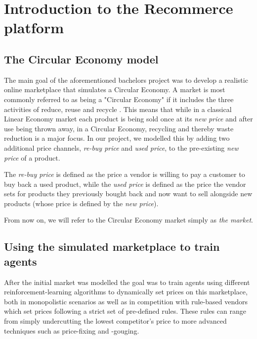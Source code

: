 \section{Introduction to the Recommerce platform}

\subsection{The Circular Economy model}\label{subsection:CircularEconomy}
The main goal of the aforementioned bachelors project was to develop a realistic online marketplace that simulates a Circular Economy. A market is most commonly referred to as being a "Circular Economy" if it includes the three activities of reduce, reuse and recycle \cite{circularEconomyDefinition}. This means that while in a classical Linear Economy market each product is being sold once at its \emph{new price} and after use being thrown away, in a Circular Economy, recycling and thereby waste reduction is a major focus. In our project, we modelled this by adding two additional price channels, \emph{re-buy price} and \emph{used price}, to the pre-existing \emph{new price} of a product.

The \emph{re-buy price} is defined as the price a vendor is willing to pay a customer to buy back a used product, while the \emph{used price} is defined as the price the vendor sets for products they previously bought back and now want to sell alongside new products (whose price is defined by the \emph{new price}).

From now on, we will refer to the Circular Economy market simply as \emph{the market}.

\subsection{Using the simulated marketplace to train agents}\label{subsection:ReinforcementLearningIntroduction}

After the initial market was modelled the goal was to train agents using different reinforcement-learning algorithms to dynamically set prices on this marketplace, both in monopolistic scenarios as well as in competition with rule-based vendors which set prices following a strict set of pre-defined rules. These rules can range from simply undercutting the lowest competitor's price to more advanced techniques such as price-fixing and -gouging.


